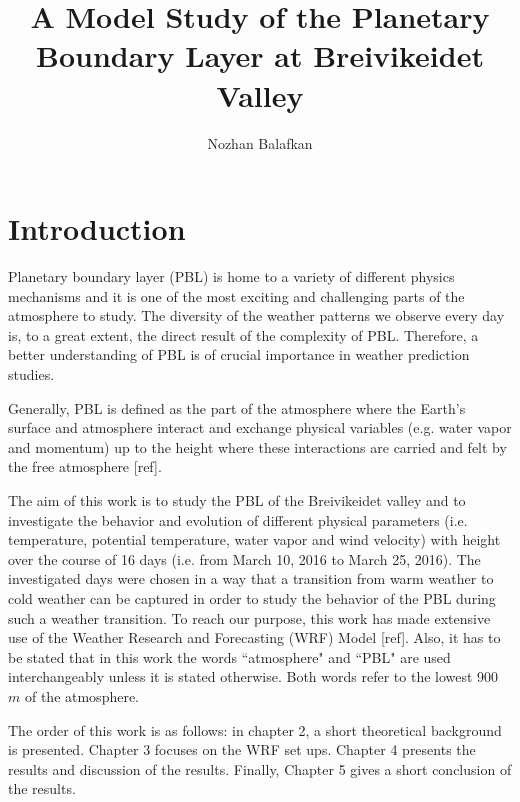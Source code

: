 \documentclass[a4paper,12pt]{article}
\author{Nozhan Balafkan}
\date{}
\title{A Model Study of the Planetary Boundary Layer at Breivikeidet Valley}
\numberwithin{equation}{section} %
\begin{document}
\clearpage\maketitle	%
\thispagestyle{empty}
\newpage


\tableofcontents
{}
\setcounter{page}{1}

\newpage
{}

\section{Introduction}

Planetary boundary layer (PBL) is home to a variety of different physics mechanisms and it is one of the most exciting and challenging parts of the atmosphere to study. The diversity of the weather patterns we observe every day is, to a great extent, the direct result of the complexity of PBL. Therefore, a better understanding of PBL is of crucial importance in weather prediction studies. 

Generally, PBL is defined as the part of the atmosphere where the Earth's surface and atmosphere interact and exchange physical variables (e.g. water vapor and momentum) up to the height where these interactions are carried and felt by the free atmosphere [ref].


The aim of this work is to study the PBL of the Breivikeidet valley and to investigate the behavior and evolution of different physical parameters (i.e. temperature, potential temperature, water vapor and wind velocity) with height over the course of 16 days (i.e. from March 10, 2016 to March 25, 2016). The investigated days were chosen in a way that a transition from warm weather to cold weather can be captured in order to study the behavior of the PBL during such a weather transition. To reach our purpose, this work has made extensive use of the Weather Research and Forecasting (WRF) Model [ref]. Also, it has to be stated that in this work the words ``atmosphere" and ``PBL" are used interchangeably unless it is stated otherwise. Both words refer to the lowest 900 $m$ of the atmosphere.

The order of this work is as follows: in chapter 2, a short theoretical background is presented. Chapter 3 focuses on the WRF set ups. Chapter 4 presents the results and discussion of the results. Finally, Chapter 5 gives a short conclusion of the results.
\end{document}
